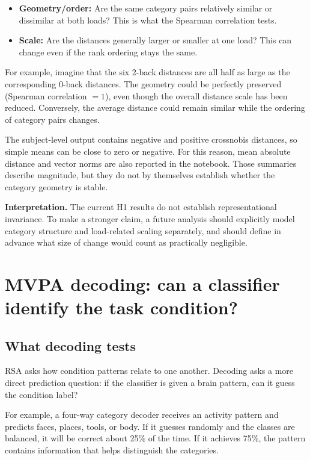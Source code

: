 \documentclass[11pt,a4paper]{article}
\begin{document}
\begin{itemize}
    \item \textbf{Geometry/order:} Are the same category pairs relatively similar or dissimilar at both loads? This is what the Spearman correlation tests.
    \item \textbf{Scale:} Are the distances generally larger or smaller at one load? This can change even if the rank ordering stays the same.
\end{itemize}

For example, imagine that the six 2-back distances are all half as large as the corresponding 0-back distances. The geometry could be perfectly preserved (Spearman correlation \(=1\)), even though the overall distance scale has been reduced. Conversely, the average distance could remain similar while the ordering of category pairs changes.

The subject-level output contains negative and positive crossnobis distances, so simple means can be close to zero or negative. For this reason, mean absolute distance and vector norms are also reported in the notebook. Those summaries describe magnitude, but they do not by themselves establish whether the category geometry is stable.

\textbf{Interpretation.} The current H1 results do not establish representational invariance. To make a stronger claim, a future analysis should explicitly model category structure and load-related scaling separately, and should define in advance what size of change would count as practically negligible.

\section{MVPA decoding: can a classifier identify the task condition?}

\subsection{What decoding tests}

RSA asks how condition patterns relate to one another. Decoding asks a more direct prediction question: if the classifier is given a brain pattern, can it guess the condition label?

For example, a four-way category decoder receives an activity pattern and predicts faces, places, tools, or body. If it guesses randomly and the classes are balanced, it will be correct about 25\% of the time. If it achieves 75\%, the pattern contains information that helps distinguish the categories.
\end{document}
